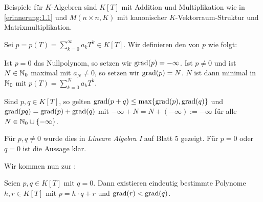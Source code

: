 Beispiele für $K$-Algebren sind $K[T]$ mit Addition und Multiplikation wie in \autoref{erinnerung:1.1} und $M(n\times n,K)$ mit kanonischer $K$-Vektorraum-Struktur und Matrixmultiplikation.

\begin{definition}[Grad]
	\label{def:1.3}
	Sei $p = p(T) = \sum_{k=0}^{\infty} a_k T^{k} \in K[T]$.
	Wir definieren den  von $p$ wie folgt:
	
	Ist $p = 0$ das Nullpolynom, so setzen wir $\operatorname{grad}(p) = -\infty$.
	Ist $p \neq 0$ und ist $N \in \mathbb{N}_0$ maximal mit $a_N \neq 0$, so setzen wir $\operatorname{grad}(p) = N$.
	$N$ ist dann minimal in $\mathbb{N}_0$ mit $p(T) = \sum_{k=0}^{N} a_k T^{k}$.
\end{definition}

\begin{lemma}
	\label{lemma:1.4}
	Sind $p,q \in K[T]$, so gelten $\operatorname{grad}(p+q) \leq \max\{\operatorname{grad}(p),\operatorname{grad}(q)\}$ und $\operatorname{grad}(pq) = \operatorname{grad}(p)+\operatorname{grad}(q)$ mit $-\infty + N = N + (-\infty) := -\infty$ für alle $N \in \mathbb{N}_0 \cup \{-\infty\}$.
\end{lemma}

\begin{beweis}
	Für $p,q \neq 0$ wurde dies in \textit{Lineare Algebra I} auf Blatt 5 gezeigt.
	Für $p = 0$ oder $q=0$ ist die Aussage klar. \qedhere
\end{beweis}

Wir kommen nun zur :
\begin{satz}
	\label{satz:1.5}
	Seien $p,q \in K[T]$ mit $q=0$.
	Dann existieren eindeutig bestimmte Polynome $h,r \in K[T]$ mit $p=h\cdot q+r$ und $\operatorname{grad}(r) < \operatorname{grad}(q)$.
\end{satz}

